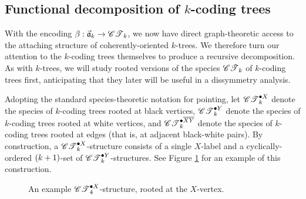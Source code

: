 \documentclass[sectionflow,singlespace,twoside,boldmathhdr,draft]{brandiss} %
\numberwithin{section}{chapter}
\numberwithin{figure}{chapter}
\begin{document}
\subsection{Functional decomposition of $k$-coding trees}\label{ss:codecomp}
With the encoding $\beta: \vec{\mathfrak{a}}_{k} \to \specname{CT}_{k}$, we now have direct graph-theoretic access to the attaching structure of coherently-oriented $k$-trees.
We therefore turn our attention to the $k$-coding trees themselves to produce a recursive decomposition.
As with $k$-trees, we will study rooted versions of the species $\specname{CT}_{k}$ of $k$-coding trees first, anticipating that they later will be useful in a dissymmetry analysis.

Adopting the standard species-theoretic notation for pointing, let $\pointed[X]{\specname{CT}}_{k}$ denote the species of $k$-coding trees rooted at black vertices, $\pointed[Y]{\specname{CT}}_{k}$ denote the species of $k$-coding trees rooted at white vertices, and $\pointed[\overline{XY}]{\specname{CT}}_{k}$ denote the species of $k$-coding trees rooted at edges (that is, at adjacent black-white pairs).
By construction, a $\pointed[X]{\specname{CT}}_{k}$-structure consists of a single $X$-label and a cyclically-ordered $\pbrac{k+1}$-set of $\pointed[Y]{\specname{CT}}_{k}$-structures.
See Figure \ref{fig:ctxconst} for an example of this construction.

\begin{figure}[htb]
  \centering
  \def\kval{4}
  \caption{An example $\pointed[X]{\specname{CT}}_{\kval}$-structure, rooted at the $X$-vertex.}
  \label{fig:ctxconst}
\end{figure}
\end{document}
